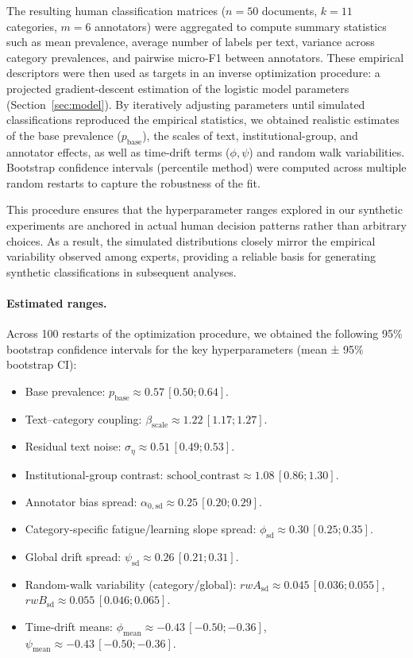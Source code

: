 \documentclass[12pt]{article}
\begin{document}
The resulting human classification matrices (\(n=50\) documents, \(k=11\) categories, 
\(m=6\) annotators) were aggregated to compute summary statistics such as mean prevalence, 
average number of labels per text, variance across category prevalences, and pairwise 
micro-F1 between annotators. These empirical descriptors were then used as targets in an 
inverse optimization procedure: a projected gradient-descent estimation of the logistic 
model parameters (Section~\ref{sec:model}). By iteratively adjusting parameters until 
simulated classifications reproduced the empirical statistics, we obtained realistic 
estimates of the base prevalence (\(p_{\text{base}}\)), the scales of text, institutional-group, and 
annotator effects, as well as time-drift terms (\(\phi, \psi\)) and random walk 
variabilities. Bootstrap confidence intervals (percentile method) were computed across multiple random restarts to 
capture the robustness of the fit.

This procedure ensures that the hyperparameter ranges explored in our synthetic experiments 
are anchored in actual human decision patterns rather than arbitrary choices. As a result, 
the simulated distributions closely mirror the empirical variability observed among experts, 
providing a reliable basis for generating synthetic classifications in subsequent analyses.

\paragraph{Estimated ranges.}  
Across 100 restarts of the optimization procedure, we obtained the following 95\% bootstrap confidence 
intervals for the key hyperparameters (mean ± 95\% bootstrap CI):

\begin{itemize}
  \item Base prevalence: \(p_{\text{base}} \approx 0.57 \,[0.50;0.64]\).
  \item Text–category coupling: \(\beta_{\text{scale}} \approx 1.22 \,[1.17;1.27]\).
  \item Residual text noise: \(\sigma_{\eta} \approx 0.51 \,[0.49;0.53]\).
  \item Institutional-group contrast: \(\text{school\_contrast} \approx 1.08 \,[0.86;1.30]\).
  \item Annotator bias spread: \(\alpha_{0,\text{sd}} \approx 0.25 \,[0.20;0.29]\).
  \item Category-specific fatigue/learning slope spread: \(\phi_{\text{sd}} \approx 0.30 \,[0.25;0.35]\).
  \item Global drift spread: \(\psi_{\text{sd}} \approx 0.26 \,[0.21;0.31]\).
  \item Random-walk variability (category/global): \(rwA_{\text{sd}} \approx 0.045 \,[0.036;0.055]\),
        \(rwB_{\text{sd}} \approx 0.055 \,[0.046;0.065]\).
  \item Time-drift means: \(\phi_{\text{mean}} \approx -0.43 \,[-0.50;-0.36]\),
        \(\psi_{\text{mean}} \approx -0.43 \,[-0.50;-0.36]\).
\end{itemize}
\end{document}
